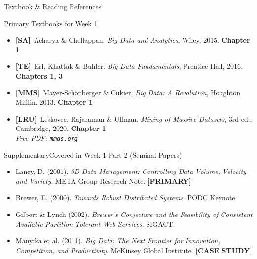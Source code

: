 \documentclass[aspectratio=169,10pt]{beamer}
\begin{document}
\begin{frame}{Textbook \& Reading References}
  \begin{block}{Primary Textbooks for Week 1}
    \begin{itemize}
      \item \textbf{[SA]}\ Acharya \& Chellappan. \textit{Big Data and Analytics}, Wiley, 2015.
            \hfill \textbf{Chapter 1}
      \item \textbf{[TE]}\ Erl, Khattak \& Buhler. \textit{Big Data Fundamentals}, Prentice Hall, 2016.
            \hfill \textbf{Chapters 1, 3}
      \item \textbf{[MMS]}\ Mayer-Schönberger \& Cukier. \textit{Big Data: A Revolution}, Houghton Mifflin, 2013.
            \hfill \textbf{Chapter 1}
      \item \textbf{[LRU]}\ Leskovec, Rajaraman \& Ullman. \textit{Mining of Massive Datasets}, 3rd ed., Cambridge, 2020.
            \hfill \textbf{Chapter 1} \\
            {\small\itshape Free PDF: \texttt{mmds.org}}
    \end{itemize}
  \end{block}
  \vspace{6pt}
  \begin{exampleblock}{Supplementary\textemdash Covered in Week 1 Part 2 (Seminal Papers)}
    \small
    \begin{itemize}
      \item Laney, D. (2001). \textit{3D Data Management: Controlling Data Volume, Velocity and Variety}. META Group Research Note. \textbf{[PRIMARY]}
      \item Brewer, E. (2000). \textit{Towards Robust Distributed Systems}. PODC Keynote.
      \item Gilbert \& Lynch (2002). \textit{Brewer's Conjecture and the Feasibility of Consistent Available Partition-Tolerant Web Services}. SIGACT.
      \item Manyika et al. (2011). \textit{Big Data: The Next Frontier for Innovation, Competition, and Productivity}. McKinsey Global Institute. \textbf{[CASE STUDY]}
    \end{itemize}
  \end{exampleblock}
\end{frame}
\end{document}
